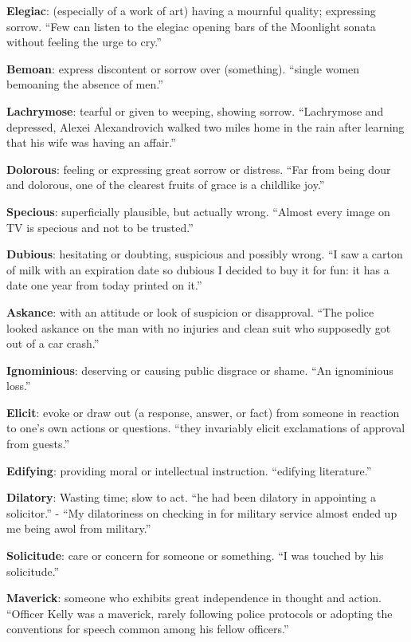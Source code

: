 \documentclass[12pt, a4paper]{ximera}
\begin{document}
\textbf{Elegiac}: (especially of a work of art) having a mournful quality; expressing sorrow. ``Few can listen to the elegiac opening bars of the Moonlight sonata without feeling the urge to cry.''

\textbf{Bemoan}: express discontent or sorrow over (something). ``single women bemoaning the absence of men.''

\textbf{Lachrymose}: tearful or given to weeping, showing sorrow. ``Lachrymose and depressed, Alexei Alexandrovich walked two miles home in the rain after learning that his wife was having an affair.''

\textbf{Dolorous}: feeling or expressing great sorrow or distress. ``Far from being dour and dolorous, one of the clearest fruits of grace is a childlike joy.''

\textbf{Specious}: superficially plausible, but actually wrong. ``Almost every image on TV is specious and not to be trusted.''

\textbf{Dubious}: hesitating or doubting, suspicious and possibly wrong. ``I saw a carton of milk with an expiration date so dubious I decided to buy it for fun: it has a date one year from today printed on it.''

\textbf{Askance}: with an attitude or look of suspicion or disapproval. ``The police looked askance on the man with no injuries and clean suit who supposedly got out of a car crash.''

\textbf{Ignominious}: deserving or causing public disgrace or shame. ``An ignominious loss.''

\textbf{Elicit}: evoke or draw out (a response, answer, or fact) from someone in reaction to one's own actions or questions. ``they invariably elicit exclamations of approval from guests.''

\textbf{Edifying}: providing moral or intellectual instruction. ``edifying literature.''

\textbf{Dilatory}: Wasting time; slow to act. ``he had been dilatory in appointing a solicitor.'' - ``My dilatoriness on checking in for military service almost ended up me being awol from military.''

\textbf{Solicitude}: care or concern for someone or something. ``I was touched by his solicitude.''

\textbf{Maverick}: someone who exhibits great independence in thought and action. ``Officer Kelly was a maverick, rarely following police protocols or adopting the conventions for speech common among his fellow officers.''
\end{document}
